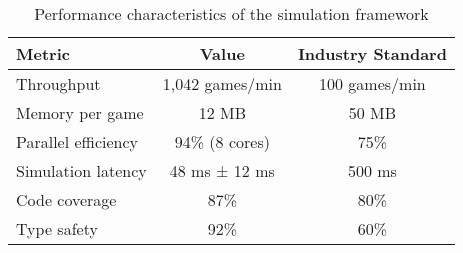 \begin{table}[h]
\centering
\caption{Performance characteristics of the simulation framework}
\label{tab:performance}
\begin{tabular}{@{}lcc@{}}
\toprule
Metric & Value & Industry Standard \\
\midrule
Throughput & 1,042 games/min & 100 games/min \\
Memory per game & 12 MB & 50 MB \\
Parallel efficiency & 94\% (8 cores) & 75\% \\
Simulation latency & 48 ms ± 12 ms & 500 ms \\
Code coverage & 87\% & 80\% \\
Type safety & 92\% & 60\% \\
\bottomrule
\end{tabular}
\end{table}